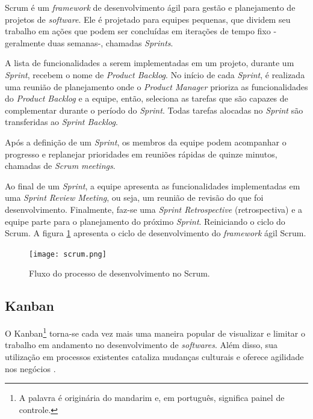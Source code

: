 Scrum é um \textit{framework} de desenvolvimento ágil para gestão e planejamento de projetos de \textit{software}. Ele é projetado para equipes pequenas, que dividem seu trabalho em ações que podem ser concluídas em iterações de tempo fixo -geralmente duas semanas-, chamadas \textit{Sprints}. \cite{pressman}

A lista de funcionalidades a serem implementadas em um projeto, durante um \textit{Sprint}, recebem o nome de \textit{Product Backlog}. No início de cada \textit{Sprint}, é realizada uma reunião de planejamento onde o \textit{Product Manager}  prioriza as funcionalidades do \textit{Product Backlog} e a equipe, então, seleciona as tarefas que são capazes de complementar durante o período do \textit{Sprint}. Todas tarefas alocadas no \textit{Sprint} são transferidas ao \textit{Sprint Backlog}.

Após a definição de um \textit{Sprint}, os membros da equipe podem acompanhar o progresso e replanejar prioridades em reuniões rápidas de quinze minutos, chamadas de \textit{Scrum meetings}.

Ao final de um \textit{Sprint}, a equipe apresenta as funcionalidades implementadas em uma \textit{Sprint Review Meeting}, ou seja, um reunião de revisão do que foi desenvolvimento. Finalmente, faz-se uma \textit{Sprint Retrospective} (retrospectiva) e a equipe parte para o planejamento do próximo \textit{Sprint}. Reiniciando o ciclo do Scrum. A figura \ref{scrumFlow} apresenta o ciclo de desenvolvimento do \textit{framework} ágil Scrum.

\begin{figure}[ht]
    \caption{Fluxo do processo de desenvolvimento no Scrum.}
       	\begin{center}
            \texttt{[image: scrum.png]}
        \end{center}
    \label{scrumFlow}
\end{figure}

\subsection{Kanban}
\label{fundSWKanban}

O Kanban\footnote{A palavra é originária do mandarim e, em português, significa painel de controle.} torna-se cada vez mais uma maneira popular de visualizar e limitar o trabalho em andamento no desenvolvimento de \textit{softwares}. Além disso, sua utilização em processos existentes cataliza mudanças culturais e oferece agilidade nos negócios \cite{kanbanBook}.

